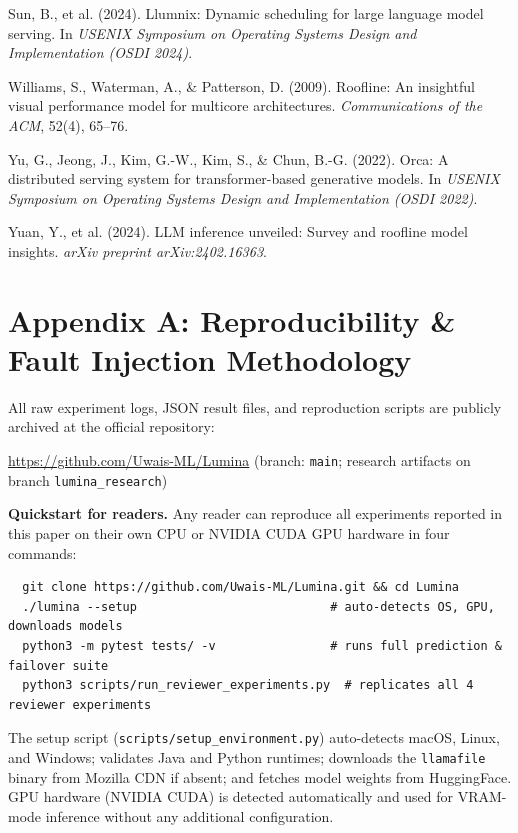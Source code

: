 \documentclass[11pt,a4paper]{article}
\newcommand{\code}[1]{\texttt{#1}}
\begin{document}
\begin{enumerate}[leftmargin=2em,label={[\arabic*]},itemsep=3pt]
\item Sun, B., et al. (2024). Llumnix: Dynamic scheduling for large language model serving. In \textit{USENIX Symposium on Operating Systems Design and Implementation (OSDI 2024)}.
\item Williams, S., Waterman, A., \& Patterson, D. (2009). Roofline: An insightful visual performance model for multicore architectures. \textit{Communications of the ACM}, 52(4), 65--76.
\item Yu, G., Jeong, J., Kim, G.-W., Kim, S., \& Chun, B.-G. (2022). Orca: A distributed serving system for transformer-based generative models. In \textit{USENIX Symposium on Operating Systems Design and Implementation (OSDI 2022)}.
\item Yuan, Y., et al. (2024). LLM inference unveiled: Survey and roofline model insights. \textit{arXiv preprint arXiv:2402.16363}.
\end{enumerate}

\section*{Appendix A: Reproducibility \& Fault Injection Methodology}
All raw experiment logs, JSON result files, and reproduction scripts are publicly archived at the official repository:
\begin{center}
\url{https://github.com/Uwais-ML/Lumina} \quad (branch: \texttt{main}; research artifacts on branch \texttt{lumina\_research})
\end{center}
\noindent\textbf{Quickstart for readers.} Any reader can reproduce all experiments reported in this paper on their own CPU or NVIDIA CUDA GPU hardware in four commands:
\begin{verbatim}
  git clone https://github.com/Uwais-ML/Lumina.git && cd Lumina
  ./lumina --setup                           # auto-detects OS, GPU, downloads models
  python3 -m pytest tests/ -v                # runs full prediction & failover suite
  python3 scripts/run_reviewer_experiments.py  # replicates all 4 reviewer experiments
\end{verbatim}
\noindent The setup script (\code{scripts/setup\_environment.py}) auto-detects macOS, Linux, and Windows; validates Java and Python runtimes; downloads the \code{llamafile} binary from Mozilla CDN if absent; and fetches model weights from HuggingFace. GPU hardware (NVIDIA CUDA) is detected automatically and used for VRAM-mode inference without any additional configuration.
\end{document}
